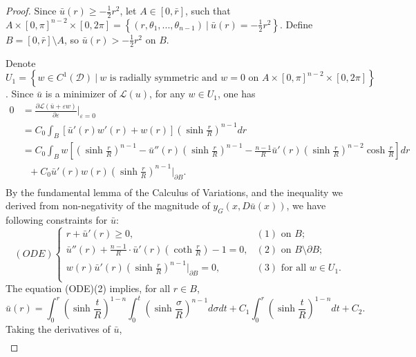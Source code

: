 \begin{proof}
	Since $\bar{u}(r)\ge -\frac{1}{2}r^2$, let $A\in [0,\bar{r}]$, such that $A\times[0,\pi]^{n-2}\times[0,2\pi] = \left\{(r,\theta_1, ...,\theta_{n-1})~|~ \bar{u}(r) = -\frac{1}{2}r^2\right\}$. Define $B =[0,\bar{r}]\setminus A$, so $\bar{u}(r)> -\frac{1}{2}r^2$ on $B$. 
	
	Denote $U_1= \left\{ w\in C^1(\mathcal{D}) ~|~ w \text{ is radially symmetric and } w = 0 \text{ on }  A\times[0,\pi]^{n-2}\times[0,2\pi] \right\}$.
	Since $\bar{u}$ is a minimizer of $\mathcal{L}(u)$, for any $w \in U_1$, one has
	\begin{equation*}
	\begin{split}
	0&=\frac{\partial \mathcal{L}(\bar{u}+\varepsilon w)}{\partial \varepsilon}\bigg|_{\varepsilon=0} \\
	&= C_0\int_B [\bar{u}'(r)w'(r)+w(r)]\left(\sinh\frac{r}{R}\right)^{n-1}dr\\
	&=C_0 \int_B w\left[\left(\sinh\frac{r}{R}\right)^{n-1}-\bar{u}''(r)\left(\sinh\frac{r}{R}\right)^{n-1}- \frac{n-1}{R}\bar{u}'(r)\left(\sinh\frac{r}{R}\right)^{n-2}\cosh\frac{r}{R}\right]dr\\& \ \ \  +C_0 \bar{u}'(r)w(r)\left(\sinh\frac{r}{R}\right)^{n-1}\bigg|_{\partial B}.\\
	\end{split}
	\end{equation*}
	By the fundamental lemma of the Calculus of Variations, and the inequality we derived from non-negativity of the magnitude of $y_G(x, D\bar{u}(x))$, we have following constraints for $\bar{u}$:
	\begin{equation*}
	(ODE) \begin{cases} 
	r+\bar{u}'(r) \ge 0, & (1)\mbox{ on } B; \\ 
	\bar{u}''(r)+\frac{n-1}{R}\cdot \bar{u}'(r)(\coth\frac{r}{R}) -1=0, & (2)\mbox{ on } B\setminus \partial B; \\
	w(r)\bar{u}'(r)(\sinh\frac{r}{R})^{n-1}|_{\partial B} =0,&(3) \mbox{ for all } w\in U_1.\\
	\end{cases}
	\end{equation*}
	The equation (ODE)(2) implies, for all $ r \in B$,
	\begin{equation*}
	\bar{u}(r) = \int_{0}^{r}\left(\sinh\frac{t}{R}\right)^{1-n} \int_{0}^{t} \left(\sinh\frac{\sigma }{R}\right)^{n-1} d\sigma  dt + C_1 \int_{0}^{r}\left(\sinh\frac{t}{R}\right)^{1-n} dt +C_2.
	\end{equation*}
	Taking the derivatives of $\bar{u}$, 
	\begin{align*}

\end{align*}
\end{proof}
